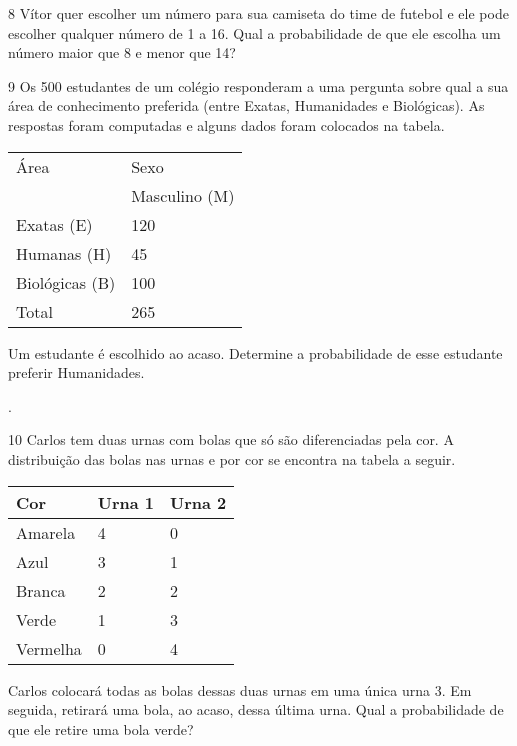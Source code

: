{


\num{8} Vítor quer escolher um número para sua camiseta do time de futebol
e ele pode escolher qualquer número de 1 a 16. Qual a probabilidade de
que ele escolha um número maior que 8 e menor que 14?



\num{9} Os 500 estudantes de um colégio responderam a uma pergunta sobre
qual a sua área de conhecimento preferida (entre Exatas, Humanidades e
Biológicas). As respostas foram computadas e alguns dados foram colocados
na tabela.

\begin{longtable}[]{@{}ll@{}}
\toprule
Área & Sexo\tabularnewline
& Masculino (M)\tabularnewline
Exatas (E) & 120\tabularnewline
Humanas (H) & 45\tabularnewline
Biológicas (B) & 100\tabularnewline
Total & 265\tabularnewline
\bottomrule
\end{longtable}

Um estudante é escolhido ao acaso. Determine a probabilidade de esse
estudante preferir Humanidades.

.


\num{10} Carlos tem duas urnas com bolas que só são diferenciadas pela
cor. A distribuição das bolas nas urnas e por cor se encontra na tabela
a seguir.

\begin{longtable}[]{@{}lll@{}}
\toprule
Cor & Urna 1 & Urna 2\tabularnewline
\midrule
\endhead
Amarela & 4 & 0\tabularnewline
Azul & 3 & 1\tabularnewline
Branca & 2 & 2\tabularnewline
Verde & 1 & 3\tabularnewline
Vermelha & 0 & 4\tabularnewline
\bottomrule
\end{longtable}

Carlos colocará todas as bolas dessas duas urnas em uma única urna 3. Em
seguida, retirará uma bola, ao acaso, dessa última urna. Qual a
probabilidade de que ele retire uma bola verde?



}
